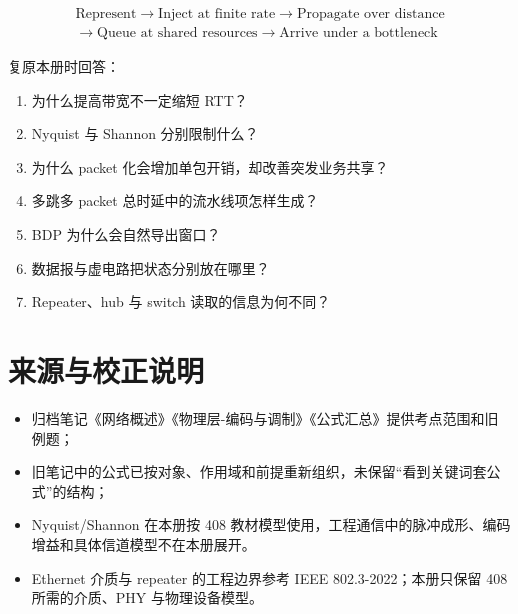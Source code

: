 \documentclass[UTF8,fontset=none,11pt,a4paper]{ctexart}
\providecommand{\tightlist}{\setlength{\itemsep}{0pt}\setlength{\parskip}{0pt}}
\begin{document}
\[
\boxed{
\begin{gathered}
\text{Represent}\to \text{Inject at finite rate}\to \text{Propagate over distance}\\
\to \text{Queue at shared resources}\to \text{Arrive under a bottleneck}
\end{gathered}
}
\]

复原本册时回答：

\begin{enumerate}
\def\labelenumi{\arabic{enumi}.}
\tightlist
\item
  为什么提高带宽不一定缩短 RTT？
\item
  Nyquist 与 Shannon 分别限制什么？
\item
  为什么 packet 化会增加单包开销，却改善突发业务共享？
\item
  多跳多 packet 总时延中的流水线项怎样生成？
\item
  BDP 为什么会自然导出窗口？
\item
  数据报与虚电路把状态分别放在哪里？
\item
  Repeater、hub 与 switch 读取的信息为何不同？
\end{enumerate}

\section{来源与校正说明}\label{13-ux6765ux6e90ux4e0eux6821ux6b63ux8bf4ux660e}

\begin{itemize}
\tightlist
\item
  归档笔记《网络概述》《物理层-编码与调制》《公式汇总》提供考点范围和旧例题；
\item
  旧笔记中的公式已按对象、作用域和前提重新组织，未保留``看到关键词套公式''的结构；
\item
  Nyquist/Shannon 在本册按 408
  教材模型使用，工程通信中的脉冲成形、编码增益和具体信道模型不在本册展开。
\item
  Ethernet 介质与 repeater 的工程边界参考 IEEE 802.3-2022；本册只保留 408 所需的介质、PHY 与物理设备模型。
\end{itemize}
\end{document}
